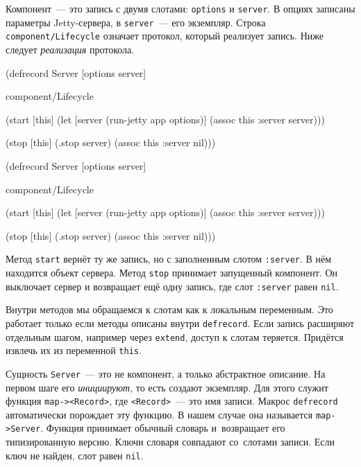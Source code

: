 \fi

Компонент~--- это запись с двумя слотами: \verb|options| и \verb|server|. В
опциях записаны параметры Jetty-сервера, в \verb|server|~--- его
экземпляр. Строка \verb|component/Lifecycle| означает протокол, который
реализует запись. Ниже следует \emph{реализация} протокола.

\ifx\DEVICETYPE\MOBILE

\begin{english}
  \begin{clojure}
(defrecord Server [options server]

  component/Lifecycle

  (start [this]
    (let [server (run-jetty app
                   options)]
      (assoc this :server server)))

  (stop [this]
    (.stop server)
    (assoc this :server nil)))
  \end{clojure}
\end{english}

\else

\begin{english}
  \begin{clojure}
(defrecord Server [options server]

  component/Lifecycle

  (start [this]
    (let [server (run-jetty app options)]
      (assoc this :server server)))

  (stop [this]
    (.stop server)
    (assoc this :server nil)))
  \end{clojure}
\end{english}
\fi


Метод \verb|start| вернёт ту же запись, но с заполненным слотом
\verb|:server|. В нём находится объект сервера. Метод \verb|stop| принимает
запущенный компонент. Он выключает сервер и возвращает ещё одну запись, где слот
\verb|:server| равен \verb|nil|.


Внутри методов мы обращаемся к слотам как к локальным переменным. Это работает
только если методы описаны внутри \verb|defrecord|. Если запись расширяют
отдельным шагом, например через \verb|extend|, доступ к слотам
теряется. Придётся извлечь их из переменной \verb|this|.

Сущность \verb|Server|~--- это не компонент, а только абстрактное описание. На
первом шаге его \emph{инициируют}, то есть создают экземпляр. Для этого служит
функция \verb|map-><Record>|, где \verb|<Record>|~--- это имя записи. Макрос
\verb|defrecord| автоматически порождает эту функцию. В нашем случае она
называется \verb|map->Server|. Функция принимает обычный словарь и~возвращает
его типизированную версию. Ключи словаря совпадают со~слотами записи. Если ключ
не найден, слот равен \verb|nil|.

